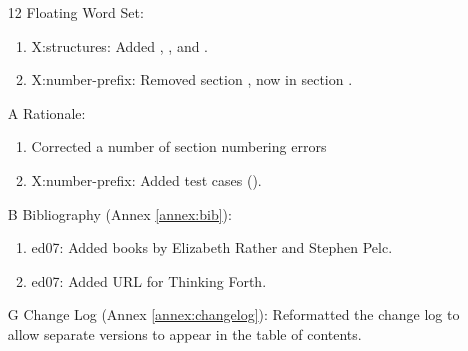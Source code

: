 \begin{itemize}
	\item[12] Floating Word Set:
		\begin{enumerate}
		\item \textsf{X:structures}: Added
			,
			, and
			.
		\item \textsf{X:number-prefix}:
			Removed section , now
			in section .
		\end{enumerate}

	\item[A] Rationale:
		\begin{enumerate}
		\item Corrected a number of section numbering errors
		\item \textsf{X:number-prefix}:
			Added test cases ().
		\end{enumerate}

	\item[B] Bibliography (Annex \ref{annex:bib}):
		\begin{enumerate}
		\item \textsf{ed07}: Added books by Elizabeth Rather
			and Stephen Pelc.
		\item \textsf{ed07}: Added URL for Thinking Forth.
		\end{enumerate}

	\item[G] Change Log (Annex \ref{annex:changelog}):
		Reformatted the change log to allow separate versions
		to appear in the table of contents.
	\end{itemize}



